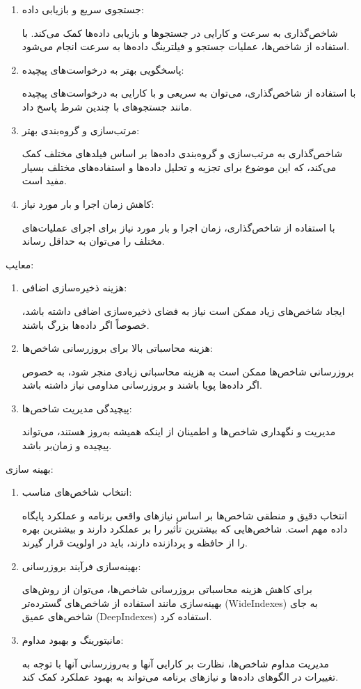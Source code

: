 \begin{enumerate}
	\item جستجوی سریع و بازیابی داده:
	
	شاخص‌گذاری به سرعت و کارایی در جستجوها و بازیابی داده‌ها کمک می‌کند. با استفاده از شاخص‌ها، عملیات جستجو و فیلترینگ داده‌ها به سرعت انجام می‌شود.
	
	\item پاسخگویی بهتر به درخواست‌های پیچیده:
	
	با استفاده از شاخص‌گذاری، می‌توان به سریعی و با کارایی به درخواست‌های پیچیده مانند جستجوهای با چندین شرط پاسخ داد.
	\item مرتب‌سازی و گروه‌بندی بهتر:
	
	شاخص‌گذاری به مرتب‌سازی و گروه‌بندی داده‌ها بر اساس فیلدهای مختلف کمک می‌کند، که این موضوع برای تجزیه و تحلیل داده‌ها و استفاده‌های مختلف بسیار مفید است.
	\item کاهش زمان اجرا و بار مورد نیاز:
	
	با استفاده از شاخص‌گذاری، زمان اجرا و بار مورد نیاز برای اجرای عملیات‌های مختلف را می‌توان به حداقل رساند.
\end{enumerate}

معایب:

\begin{enumerate}
\item هزینه ذخیره‌سازی اضافی:
	
	ایجاد شاخص‌های زیاد ممکن است نیاز به فضای ذخیره‌سازی اضافی داشته باشد، خصوصاً اگر داده‌ها بزرگ باشند.
\item هزینه محاسباتی بالا برای بروزرسانی شاخص‌ها:
	
	بروزرسانی شاخص‌ها ممکن است به هزینه محاسباتی زیادی منجر شود، به خصوص اگر داده‌ها پویا باشند و بروزرسانی مداومی نیاز داشته باشد.
\item پیچیدگی مدیریت شاخص‌ها:
	
	مدیریت و نگهداری شاخص‌ها و اطمینان از اینکه همیشه به‌روز هستند، می‌تواند پیچیده و زمان‌بر باشد.
\end{enumerate}

بهینه سازی:
\begin{enumerate}
\item انتخاب شاخص‌های مناسب:
	
	انتخاب دقیق و منطقی شاخص‌ها بر اساس نیازهای واقعی برنامه و عملکرد پایگاه داده مهم است. شاخص‌هایی که بیشترین تأثیر را بر عملکرد دارند و بیشترین بهره را از حافظه و پردازنده دارند، باید در اولویت قرار گیرند.
	\item بهینه‌سازی فرآیند بروزرسانی:
	
	برای کاهش هزینه محاسباتی بروزرسانی شاخص‌ها، می‌توان از روش‌های بهینه‌سازی مانند استفاده از شاخص‌های گسترده‌تر (WideIndexes) به جای شاخص‌های عمیق (DeepIndexes) استفاده کرد.
	\item مانیتورینگ و بهبود مداوم:
	
	مدیریت مداوم شاخص‌ها، نظارت بر کارایی آنها و به‌روزرسانی آنها با توجه به تغییرات در الگوهای داده‌ها و نیازهای برنامه می‌تواند به بهبود عملکرد کمک کند.
\end{enumerate}

